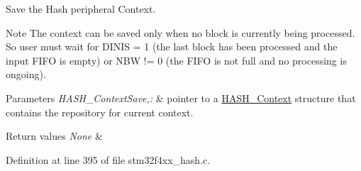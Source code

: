 Save the Hash peripheral Context. 

\begin{DoxyNote}{Note}
The context can be saved only when no block is currently being processed. So user must wait for D\-I\-N\-I\-S = 1 (the last block has been processed and the input F\-I\-F\-O is empty) or N\-B\-W != 0 (the F\-I\-F\-O is not full and no processing is ongoing). 
\end{DoxyNote}

\begin{DoxyParams}{Parameters}
{\em H\-A\-S\-H\-\_\-\-Context\-Save,\-:} & pointer to a \hyperlink{struct_h_a_s_h___context}{H\-A\-S\-H\-\_\-\-Context} structure that contains the repository for current context. \\
\hline
\end{DoxyParams}

\begin{DoxyRetVals}{Return values}
{\em None} & \\
\hline
\end{DoxyRetVals}


Definition at line 395 of file stm32f4xx\-\_\-hash.\-c.

